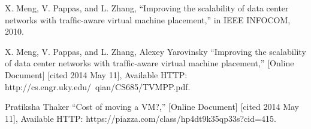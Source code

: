 \documentclass[11pt]{article}
\begin{document}
\begin{thebibliography}{9}

  X. Meng, V. Pappas, and L. Zhang, ``Improving the scalability of data
center networks with trafﬁc-aware virtual machine placement,'' in IEEE
INFOCOM, 2010.

X. Meng, V. Pappas, and L. Zhang, Alexey Yarovinsky ``Improving the scalability of data
center networks with trafﬁc-aware virtual machine placement,'' [Online Document] [cited 2014 May 11], Available HTTP: http://cs.engr.uky.edu/~qian/CS685/TVMPP.pdf.

 Pratiksha Thaker ``Cost of moving a VM?,'' [Online Document] [cited 2014 May 11], Available HTTP: https://piazza.com/class/hp4dt9k35qp33s?cid=415.

\end{thebibliography}
\end{document}
